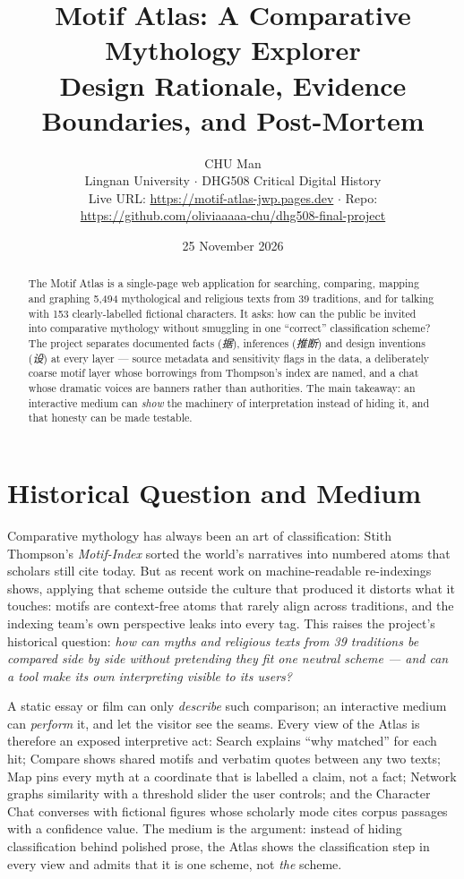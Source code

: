 \documentclass[12pt,a4paper]{article}
\title{\textbf{Motif Atlas: A Comparative Mythology Explorer}\\[0.3em]
\large Design Rationale, Evidence Boundaries, and Post-Mortem}
\author{CHU Man\\Lingnan University $\cdot$ DHG508 Critical Digital History\\
\small Live URL: \url{https://motif-atlas-jwp.pages.dev} $\cdot$ Repo: \url{https://github.com/oliviaaaaa-chu/dhg508-final-project}}
\date{25 November 2026}
\begin{document}
\maketitle

\begin{abstract}
\noindent
The Motif Atlas is a single-page web application for searching, comparing,
mapping and graphing 5{,}494 mythological and religious texts from 39
traditions, and for talking with 153 clearly-labelled fictional characters.
It asks: how can the public be invited into comparative mythology without
smuggling in one ``correct'' classification scheme? The project separates
documented facts (\emph{据}), inferences (\emph{推断}) and design inventions
(\emph{设}) at every layer --- source metadata and sensitivity flags in the
data, a deliberately coarse motif layer whose borrowings from Thompson's
index are named, and a chat whose dramatic voices are banners rather than
authorities. The main takeaway: an interactive medium can \emph{show} the
machinery of interpretation instead of hiding it, and that honesty can be
made testable.
\end{abstract}

\onehalfspacing

\section{Historical Question and Medium}

Comparative mythology has always been an art of classification: Stith
Thompson's \emph{Motif-Index} sorted the world's narratives into numbered
atoms that scholars still cite today.\autocite{thompson1955motif} But as
recent work on machine-readable re-indexings shows, applying that scheme
outside the culture that produced it distorts what it touches: motifs are
context-free atoms that rarely align across traditions, and the indexing
team's own perspective leaks into every tag.\autocite[6]{jokisch2025motif} This raises
the project's historical question: \emph{how can myths and religious texts
from 39 traditions be compared side by side without pretending they fit one
neutral scheme --- and can a tool make its own interpreting visible to its
users?}

A static essay or film can only \emph{describe} such comparison; an
interactive medium can \emph{perform} it, and let the visitor see the seams.
Every view of the Atlas is therefore an exposed interpretive act: Search
explains ``why matched'' for each hit; Compare shows shared motifs and
verbatim quotes between any two texts; Map pins every myth at a coordinate
that is labelled a claim, not a fact; Network graphs similarity with a
threshold slider the user controls; and the Character Chat converses with
fictional figures whose scholarly mode cites corpus passages with a
confidence value. The medium is the argument: instead of hiding
classification behind polished prose, the Atlas shows the classification
step in every view and admits that it is one scheme, not \emph{the} scheme.
\end{document}

